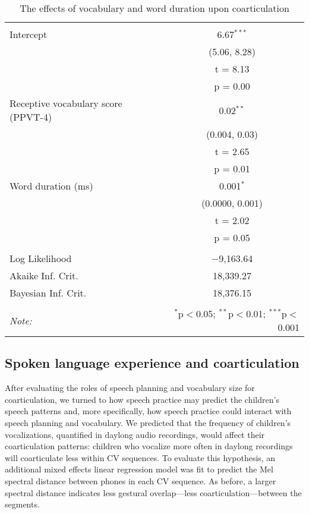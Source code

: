 \documentclass[a4paper,man,natbib,donotrepeattitle, apacite]{apa6}
\begin{document}
\begin{table}[!htbp] \centering 
  \caption{The effects of vocabulary and word duration upon coarticulation} 
  \label{tab:model-1} 
\begin{tabular}{@{\extracolsep{5pt}}lc} 
\\[-1.8ex]\hline 
\hline \\[-1.8ex] 
 Intercept & 6.67$^{***}$ \\ 
  & (5.06, 8.28) \\ 
  & t = 8.13 \\ 
  & p = 0.00 \\ 
  Receptive vocabulary score (PPVT-4) & 0.02$^{**}$ \\ 
  & (0.004, 0.03) \\ 
  & t = 2.65 \\ 
  & p = 0.01 \\ 
  Word duration (ms) & 0.001$^{*}$ \\ 
  & (0.0000, 0.001) \\ 
  & t = 2.02 \\ 
  & p = 0.05 \\ 
 \hline \\[-1.8ex] 
Log Likelihood & $-$9,163.64 \\ 
Akaike Inf. Crit. & 18,339.27 \\ 
Bayesian Inf. Crit. & 18,376.15 \\ 
\hline 
\hline \\[-1.8ex] 
\textit{Note:}  & \multicolumn{1}{r}{$^{*}$p$<$0.05; $^{**}$p$<$0.01; $^{***}$p$<$0.001} \\ 
\end{tabular} 
\end{table}


\subsection{Spoken language experience and coarticulation}

After evaluating the roles of speech planning and vocabulary size for coarticulation, we turned to how speech practice may predict the children’s speech patterns and, more specifically, how speech practice could interact with speech planning and vocabulary. We predicted that the frequency of children’s vocalizations, quantified in daylong audio recordings, would affect their coarticulation patterns: children who vocalize more often in daylong recordings will coarticulate less within CV sequences. To evaluate this hypothesis, an additional mixed effects linear regression model was fit to predict the Mel spectral distance between phones in each CV sequence. As before, a larger spectral distance indicates less gestural overlap---less coarticulation---between the segments.
\end{document}

